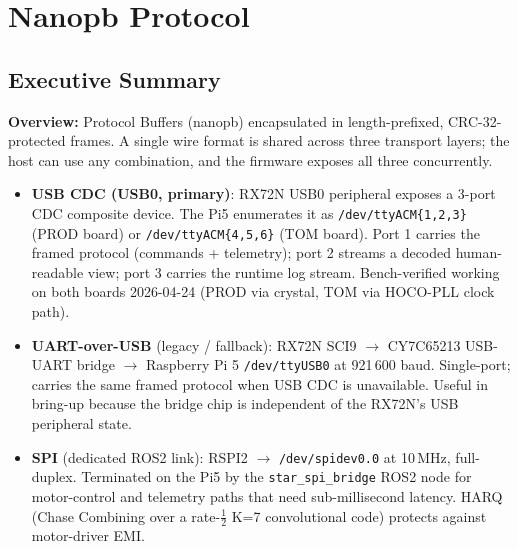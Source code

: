 
\section{Nanopb Protocol}
\label{section:nanopb-protocol}

\subsection{Executive Summary}

\textbf{Overview:} Protocol Buffers (nanopb) encapsulated in length-prefixed,
CRC-32-protected frames. A single wire format is shared across three
transport layers; the host can use any combination, and the firmware
exposes all three concurrently.

\begin{itemize}
  \item \textbf{USB CDC (USB0, primary)}: RX72N USB0 peripheral exposes a
        3-port CDC composite device. The Pi5 enumerates it as
        \texttt{/dev/ttyACM\{1,2,3\}} (PROD board) or
        \texttt{/dev/ttyACM\{4,5,6\}} (TOM board). Port 1 carries the
        framed protocol (commands + telemetry); port 2 streams a
        decoded human-readable view; port 3 carries the runtime log
        stream. Bench-verified working on both boards 2026-04-24
        (PROD via crystal, TOM via HOCO-PLL clock path).
  \item \textbf{UART-over-USB} (legacy / fallback): RX72N SCI9 $\rightarrow$
        CY7C65213 USB-UART bridge $\rightarrow$ Raspberry Pi 5
        \texttt{/dev/ttyUSB0} at 921\,600 baud. Single-port; carries the
        same framed protocol when USB CDC is unavailable. Useful in
        bring-up because the bridge chip is independent of the RX72N's
        USB peripheral state.
  \item \textbf{SPI} (dedicated ROS2 link): RSPI2 $\rightarrow$
        \texttt{/dev/spidev0.0} at 10\,MHz, full-duplex. Terminated on the Pi5
        by the \texttt{star\_spi\_bridge} ROS2 node for motor-control and
        telemetry paths that need sub-millisecond latency. HARQ (Chase
        Combining over a rate-$\frac{1}{2}$ K=7 convolutional code) protects
        against motor-driver EMI.
\end{itemize}

